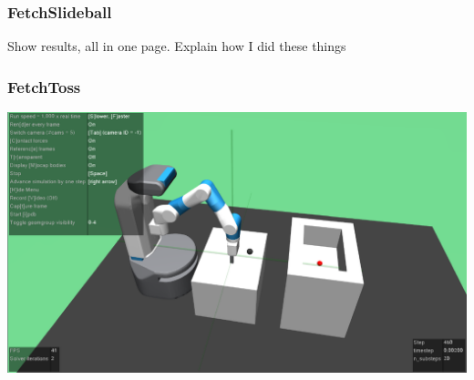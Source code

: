 





\begin{frame}
	\frametitle{FetchSlideball}	
	\vspace{1cm}
	
	Show results, all in one page. Explain how I did these things
	
	
\end{frame}
\clearpage









\begin{frame}
	\frametitle{FetchToss}	
	\vspace{1cm}
	
	\includegraphics[width=\textwidth, height=.55\textheight]{./Ressourcen/Figures/FetchToss-v1.pdf}
	
\end{frame}
\clearpage







